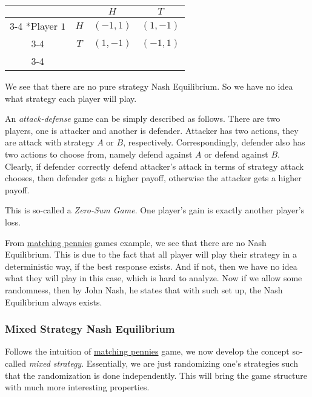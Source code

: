 \begin{eg}
\begin{enumerate}
\begin{table}[H]
\begin{tabular}{cc|c|c|}
				                                & \multicolumn{1}{c}{} & \multicolumn{1}{c}{$H$}        & \multicolumn{1}{c}{$T$} \\\cline{3-4}
				      \multirow{2}*{Player $1$} & $H$                  & $(-1, 1)$                      & $(1, -1)$               \\\cline{3-4}
				                                & $T$                  & $(1, -1)$                      & $(-1, 1)$               \\\cline{3-4}
			      \end{tabular}
		      \end{table}
		      We see that there are no pure strategy Nash Equilibrium. So we have no idea what strategy each player will play.
		      \begin{note}
			      An \emph{attack-defense} game can be simply described as follows. There are two players, one is attacker and another is defender. Attacker has two actions,
			      they are attack with strategy \(A\) or \(B\), respectively. Correspondingly, defender also has two actions to choose from, namely defend against \(A\)
			      or defend against \(B\). Clearly, if defender correctly defend attacker's attack in terms of strategy attack chooses, then defender gets a higher payoff,
			      otherwise the attacker gets a higher payoff.
		      \end{note}
		      \begin{remark}
			      This is so-called a \emph{Zero-Sum Game}. One player's gain is exactly another player's loss.
		      \end{remark}
	\end{enumerate}
\end{eg}

\begin{remark}
	From \hyperref[matching-pennies]{matching pennies} games example, we see that there are no Nash Equilibrium. This is due to the fact that all player will play
	their strategy in a deterministic way, if the best response exists. And if not, then we have no idea what they will play in this case, which is hard to analyze.
	Now if we allow some randomness, then by John Nash, he states that with such set up, the Nash Equilibrium always exists.
\end{remark}

\subsubsection{Mixed Strategy Nash Equilibrium}
Follows the intuition of \hyperref[matching-pennies]{matching pennies} game, we now develop the concept so-called \emph{mixed strategy}. Essentially, we are just
randomizing one's strategies such that the randomization is done independently. This will bring the game structure with much more interesting properties.

